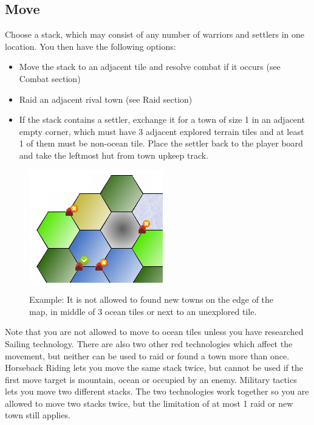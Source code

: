 \documentclass[11pt,a4paper,titlepage]{article}
\begin{document}
{  \subsection{Move}{
    Choose a stack, which may consist of any number of warriors and settlers
    in one location. You then have the following options:
    \begin{itemize}
    \item Move the stack to an adjacent tile and resolve combat if it occurs
      (see Combat section)
    \item Raid an adjacent rival town (see Raid section)
    \item If the stack contains a settler, exchange it for a town of size 1
      in an adjacent empty corner, which must have 3 adjacent explored
      terrain tiles and at least 1 of them must be non-ocean tile. Place the
      settler back
      to the player board and take the leftmost hut from town upkeep track.
    \end{itemize}

    \begin{figure}[!htb]
      \begin{minipage}[c]{0.2\textwidth}
        \label{fig:tech_irrigation}
        \includegraphics[scale=.6]{doe_example_new_town.png}
      \end{minipage}\hfill
      \begin{minipage}[c]{0.4\textwidth}
        \captionsetup{labelformat=empty, justification=justified, singlelinecheck=false}
        \caption{Example: It is not allowed to found new towns on the edge
          of the map, in middle of 3 ocean tiles or next to an unexplored tile.}
      \end{minipage}\hfill
      \label{fig:example_new_town}
    \end{figure}
    
    \noindent
    Note that you are not allowed to move to ocean tiles unless you have
    researched Sailing technology. There are also two other red technologies
    which affect the movement, but neither can be used to raid or found a town
    more than once. Horseback Riding lets you move the same stack twice, but
    cannot be used if the first move target is mountain, ocean or occupied
    by an enemy. Military tactics lets you move two different stacks. The two
    technologies work together so you are allowed to move two stacks twice, but
    the limitation of at most 1 raid or new town still applies.
    
}}
\end{document}
